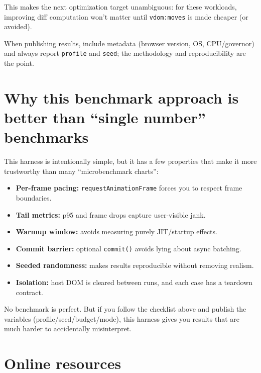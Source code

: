This makes the next optimization target unambiguous: for these workloads, improving diff computation won't matter until \texttt{vdom:moves} is made cheaper (or avoided).

When publishing results, include metadata (browser version, OS, CPU/governor) and always report \texttt{profile} and \texttt{seed}; the methodology and reproducibility are the point.

\section{Why this benchmark approach is better than ``single number'' benchmarks}

This harness is intentionally simple, but it has a few properties that make it more trustworthy than many ``microbenchmark charts'':

\begin{itemize}
\item \textbf{Per-frame pacing:} \texttt{requestAnimationFrame} forces you to respect frame boundaries.
\item \textbf{Tail metrics:} p95 and frame drops capture user-visible jank.
\item \textbf{Warmup window:} avoids measuring purely JIT/startup effects.
\item \textbf{Commit barrier:} optional \texttt{commit()} avoids lying about async batching.
\item \textbf{Seeded randomness:} makes results reproducible without removing realism.
\item \textbf{Isolation:} host DOM is cleared between runs, and each case has a teardown contract.
\end{itemize}

No benchmark is perfect.
But if you follow the checklist above and publish the variables (profile/seed/budget/mode), this harness gives you results that are much harder to accidentally misinterpret.

\section{Online resources}

